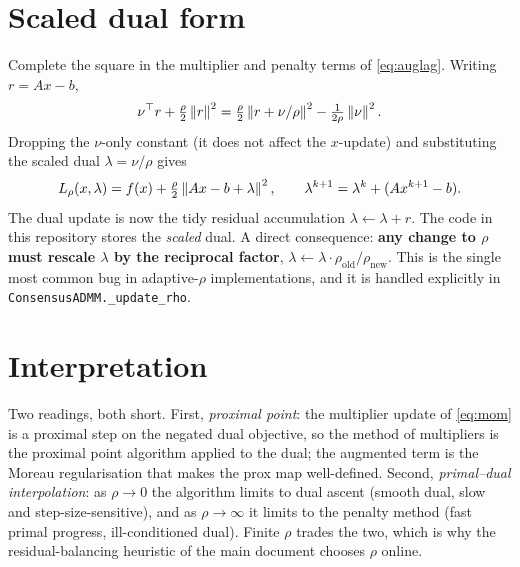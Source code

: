 \documentclass[11pt]{article}
\begin{document}
\section{Scaled dual form}

Complete the square in the multiplier and penalty terms of \eqref{eq:auglag}. Writing
$r = Ax - b$,
\begin{equation}
\nu^\top r + \tfrac{\rho}{2}\left\lVert r \right\rVert^2
= \tfrac{\rho}{2}\left\lVert r + \nu/\rho \right\rVert^2 - \tfrac{1}{2\rho}\left\lVert \nu \right\rVert^2.
\end{equation}
Dropping the $\nu$-only constant (it does not affect the $x$-update) and substituting the
scaled dual $\lambda = \nu/\rho$ gives
\begin{equation}
L_\rho(x,\lambda) = f(x) + \tfrac{\rho}{2}\left\lVert Ax - b + \lambda \right\rVert^2,
\qquad
\lambda^{k+1} = \lambda^k + (A x^{k+1} - b).
\label{eq:scaled}
\end{equation}
The dual update is now the tidy residual accumulation $\lambda \leftarrow \lambda + r$. The
code in this repository stores the \emph{scaled} dual. A direct consequence: \textbf{any
change to $\rho$ must rescale $\lambda$ by the reciprocal factor},
$\lambda \leftarrow \lambda \cdot \rho_{\mathrm{old}}/\rho_{\mathrm{new}}$. This is the
single most common bug in adaptive-$\rho$ implementations, and it is handled explicitly in
\verb|ConsensusADMM._update_rho|.

\section{Interpretation}

Two readings, both short. First, \emph{proximal point}: the multiplier update of
\eqref{eq:mom} is a proximal step on the negated dual objective, so the method of
multipliers is the proximal point algorithm applied to the dual; the augmented term is the
Moreau regularisation that makes the prox map well-defined. Second, \emph{primal--dual
interpolation}: as $\rho \to 0$ the algorithm limits to dual ascent (smooth dual, slow and
step-size-sensitive), and as $\rho \to \infty$ it limits to the penalty method (fast primal
progress, ill-conditioned dual). Finite $\rho$ trades the two, which is why the
residual-balancing heuristic of the main document chooses $\rho$ online.

\nocite{*}


\end{document}
